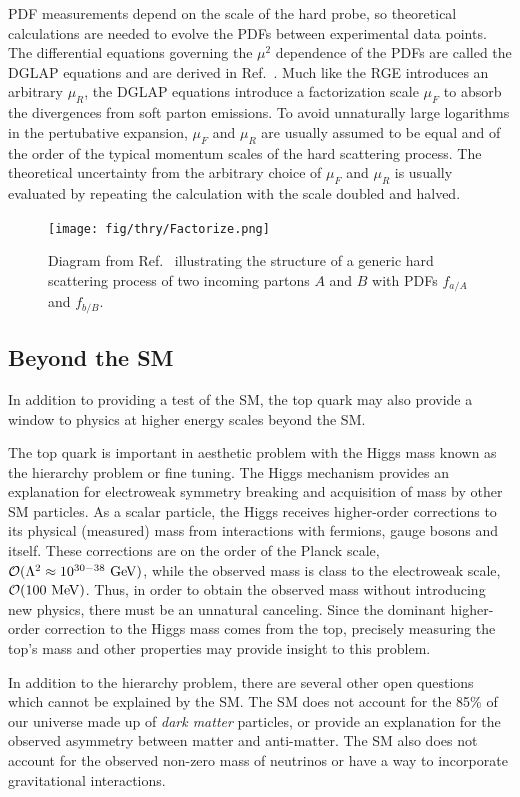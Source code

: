 PDF measurements depend on the scale of the hard probe, so theoretical calculations are needed to evolve the PDFs between experimental data points. The differential equations governing the $\mu^2$ dependence of the PDFs are called the DGLAP equations and are derived in Ref.~\cite{Altarelli:1977zs}. Much like the RGE introduces an arbitrary $\mu_R$, the DGLAP equations introduce a factorization scale $\mu_F$ to absorb the divergences from soft parton emissions. To avoid unnaturally large logarithms in the pertubative expansion,  $\mu_F$ and $\mu_R$ are usually assumed to be equal and of the order of the typical momentum scales of the hard scattering process. The theoretical uncertainty from the arbitrary choice of $\mu_F$ and $\mu_R$ is usually evaluated by repeating the calculation with the scale doubled and halved.

\begin{figure}[h]
\texttt{[image: fig/thry/Factorize.png]}
\caption{Diagram from Ref.~\cite{Campbell:2006wx} illustrating the structure of a generic hard scattering process of two incoming partons $A$ and $B$ with PDFs $f_{a/A}$ and $f_{b/B}$.}
\label{fig:factorize}
\end{figure}




\subsection{Beyond the SM}
In addition to providing a test of the SM, the top quark may also provide a window to physics at higher energy scales beyond the SM.

The top quark is important in aesthetic problem with the Higgs mass known as the hierarchy problem or fine tuning. The Higgs mechanism provides an explanation for electroweak symmetry breaking and acquisition of mass by other SM particles. As a scalar particle, the Higgs receives higher-order corrections to its physical (measured) mass from interactions with fermions, gauge bosons and itself. These corrections are on the order of the Planck scale, $\mathcal{O}(\Lambda^2 \approx 10^{30-38} \gev)$, while the observed mass is class to the electroweak scale, $\mathcal{O}(100 \mev)$. Thus, in order to obtain the observed mass without introducing new physics, there must be an unnatural canceling. Since the dominant higher-order correction to the Higgs mass comes from the top, precisely measuring the top's mass and other properties may provide insight to this problem. 

In addition to the hierarchy problem, there are several other open questions which cannot be explained by the SM. The SM does not account for the 85\% of our universe made up of \textit{dark matter} particles, or provide an explanation for the observed asymmetry between matter and anti-matter. The SM also does not account for the observed non-zero mass of neutrinos or have a way to incorporate gravitational interactions.

